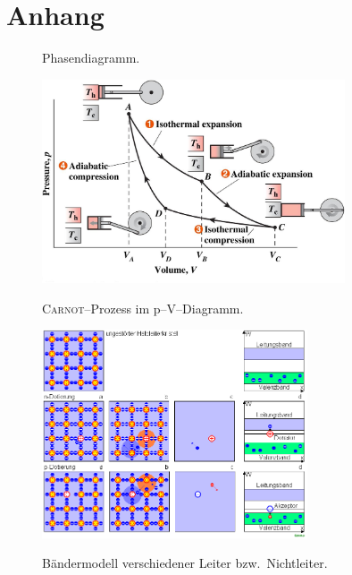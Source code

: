 \documentclass[a4paper,12pt]{article}
\numberwithin{equation}{section}
\begin{document}
\section{Anhang}
\begin{figure}[h]
        \centering
        \label{fig:phasendiagramme}
        \caption{Phasendiagramm.}
\end{figure}

\begin{figure}
        \centering
        \includegraphics[width=0.8\textwidth]{therm_carnot_fig1}\label{fig:carnotprozess_im_pv_diagramm}
        \caption{\textsc{Carnot}--Prozess im p--V--Diagramm.}
\end{figure}
\begin{figure}
        \centering
        \includegraphics[width=0.7\textwidth]{Halbleiter1}\label{fig:halbleiter}
        \caption{Bändermodell verschiedener Leiter bzw.\ Nichtleiter.}
\end{figure}

\end{document}
